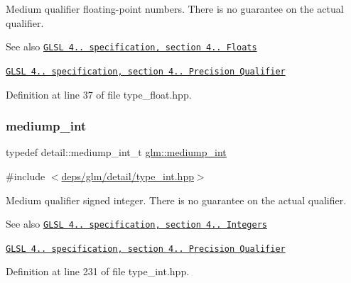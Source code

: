 Medium qualifier floating-\/point numbers. There is no guarantee on the actual qualifier.

\begin{DoxySeeAlso}{See also}
\href{http://www.opengl.org/registry/doc/GLSLangSpec.4.20.8.pdf}{\tt G\+L\+SL 4.. specification, section 4.. Floats} 

\href{http://www.opengl.org/registry/doc/GLSLangSpec.4.20.8.pdf}{\tt G\+L\+SL 4.. specification, section 4.. Precision Qualifier} 
\end{DoxySeeAlso}


Definition at line 37 of file type\+\_\+float.\+hpp.

\mbox{\label{group__core__precision_ga2a3dcbcd7f4e17663d393a12061ac6ac}} 
\subsubsection{\texorpdfstring{mediump\+\_\+int}{mediump\_int}}
{\footnotesize\ttfamily typedef detail\+::mediump\+\_\+int\+\_\+t \hyperlink{group__core__precision_ga2a3dcbcd7f4e17663d393a12061ac6ac}{glm\+::mediump\+\_\+int}}



{\ttfamily \#include $<$\hyperlink{type__int_8hpp}{deps/glm/detail/type\+\_\+int.\+hpp}$>$}

Medium qualifier signed integer. There is no guarantee on the actual qualifier.

\begin{DoxySeeAlso}{See also}
\href{http://www.opengl.org/registry/doc/GLSLangSpec.4.20.8.pdf}{\tt G\+L\+SL 4.. specification, section 4.. Integers} 

\href{http://www.opengl.org/registry/doc/GLSLangSpec.4.20.8.pdf}{\tt G\+L\+SL 4.. specification, section 4.. Precision Qualifier} 
\end{DoxySeeAlso}


Definition at line 231 of file type\+\_\+int.\+hpp.

\mbox{\label{group__core__precision_ga0efcfa6750f1c7197ff1c3390521ffd7}} 
